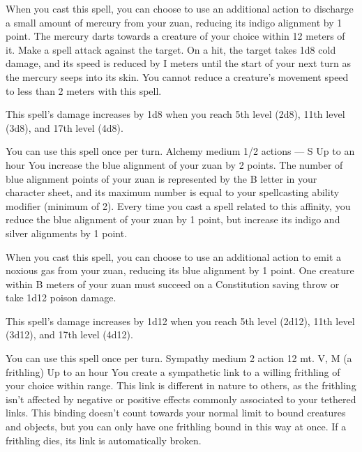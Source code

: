     When you cast this spell, you can choose to use an additional action to discharge a small amount of mercury from your zuan, reducing its indigo alignment by 1 point.
    The mercury darts towards a creature of your choice within 12 meters of it.
    Make a spell attack against the target.
    On a hit, the target takes 1d8 cold damage, and its speed is reduced by I meters until the start of your next turn as the mercury seeps into its skin.
    You cannot reduce a creature's movement speed to less than 2 meters with this spell.

    This spell's damage increases by 1d8 when you reach 5th level (2d8), 11th level (3d8), and 17th level (4d8).

    You can use this spell once per turn.
    {Alchemy medium}
    {1/2 actions}
    {---}
    {S}
    {Up to an hour}
    You increase the blue alignment of your zuan by 2 points.
    The number of blue alignment points of your zuan is represented by the B letter in your character sheet, and its maximum number is equal to your spellcasting ability modifier (minimum of 2).
    Every time you cast a spell related to this affinity, you reduce the blue alignment of your zuan by 1 point, but increase its indigo and silver alignments by 1 point.

    When you cast this spell, you can choose to use an additional action to emit a noxious gas from your zuan, reducing its blue alignment by 1 point.
    One creature within B meters of your zuan must succeed on a Constitution saving throw or take 1d12 poison damage.

    This spell's damage increases by 1d12 when you reach 5th level (2d12), 11th level (3d12), and 17th level (4d12).

    You can use this spell once per turn.
    {Sympathy medium}
    {2 action}
    {12 mt.}
    {V, M (a frithling)}
    {Up to an hour}
    You create a sympathetic link to a willing frithling of your choice within range.
    This link is different in nature to others, as the frithling isn't affected by negative or positive effects commonly associated to your tethered links.
    This binding doesn't count towards your normal limit to bound creatures and objects, but you can only have one frithling bound in this way at once.
    If a frithling dies, its link is automatically broken.

